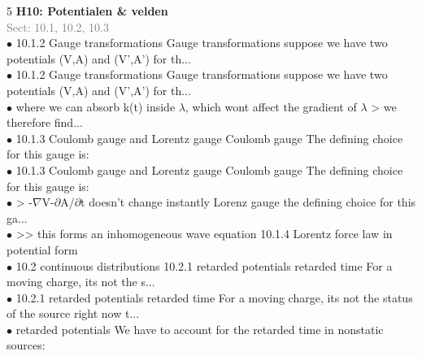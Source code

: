 \documentclass[7pt,a4paper]{article}
\begin{document}
\begin{multicols*}{5}
\textbf{H10: Potentialen & velden}\\\textcolor{gray}{{Sect: 10.1, 10.2, 10.3}}\\\vspace{0.5pt}
$\bullet$ 10.1.2 Gauge transformations 
Gauge transformations suppose we have two potentials (V,A) and (V',A') for th...\\
$\bullet$ 10.1.2 Gauge transformations 
Gauge transformations suppose we have two potentials (V,A) and (V',A') for th...\\
$\bullet$ where we can absorb k(t) inside $\lambda$, which wont affect the gradient of $\lambda$ 
> we therefore find...\\
$\bullet$ 10.1.3 Coulomb gauge and Lorentz gauge 
Coulomb gauge The defining choice for this gauge is:\\
$\bullet$ 10.1.3 Coulomb gauge and Lorentz gauge 
Coulomb gauge The defining choice for this gauge is:\\
$\bullet$ > -$\nabla$V-$\partial$A/$\partial$t doesn't change instantly 
Lorenz gauge the defining choice for this ga...\\
$\bullet$ >> this forms an inhomogeneous wave equation 
10.1.4 Lorentz force law in potential form\\
$\bullet$ 10.2 continuous distributions 
10.2.1 retarded potentials 
retarded time For a moving charge, its not the s...\\
$\bullet$ 10.2.1 retarded potentials 
retarded time For a moving charge, its not the status of the source right now t...\\
$\bullet$ retarded potentials We have to account for the retarded time in nonstatic sources:\\
\columnbreak


\end{multicols*}
\end{document}
